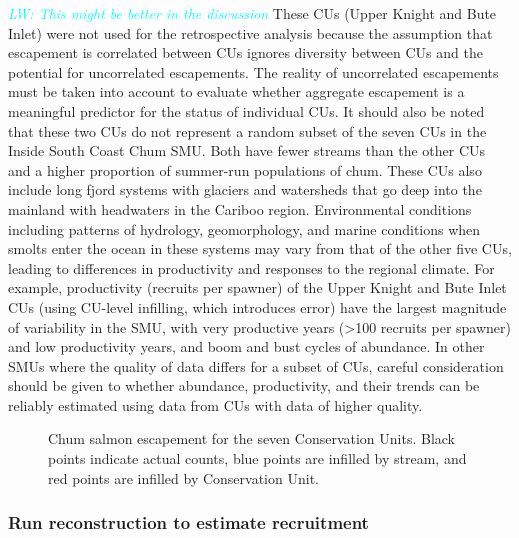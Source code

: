 \documentclass[11pt]{book}
\begin{document}
\emph{\textcolor{cyan}{LW: This might be better in the discussion}} These CUs (Upper Knight and Bute Inlet) were not used for the retrospective analysis because the assumption that escapement is correlated between CUs ignores diversity between CUs and the potential for uncorrelated escapements. The reality of uncorrelated escapements must be taken into account to evaluate whether aggregate escapement is a meaningful predictor for the status of individual CUs. It should also be noted that these two CUs do not represent a random subset of the seven CUs in the Inside South Coast Chum SMU. Both have fewer streams than the other CUs and a higher proportion of summer-run populations of chum. These CUs also include long fjord systems with glaciers and watersheds that go deep into the mainland with headwaters in the Cariboo region. Environmental conditions including patterns of hydrology, geomorphology, and marine conditions when smolts enter the ocean in these systems may vary from that of the other five CUs, leading to differences in productivity and responses to the regional climate. For example, productivity (recruits per spawner) of the Upper Knight and Bute Inlet CUs (using CU-level infilling, which introduces error) have the largest magnitude of variability in the SMU, with very productive years (\textgreater100 recruits per spawner) and low productivity years, and boom and bust cycles of abundance. In other SMUs where the quality of data differs for a subset of CUs, careful consideration should be given to whether abundance, productivity, and their trends can be reliably estimated using data from CUs with data of higher quality.
\begin{figure}[htb]

{\centering {} 

}

\caption{Chum salmon escapement for the seven Conservation Units. Black points indicate actual counts, blue points are infilled by stream, and red points are infilled by Conservation Unit.}\label{fig:chum-escapement-infill}
\end{figure}
\hypertarget{run-reconstruction-to-estimate-recruitment}{%
\subsubsection{Run reconstruction to estimate recruitment}\label{run-reconstruction-to-estimate-recruitment}}
\end{document}

